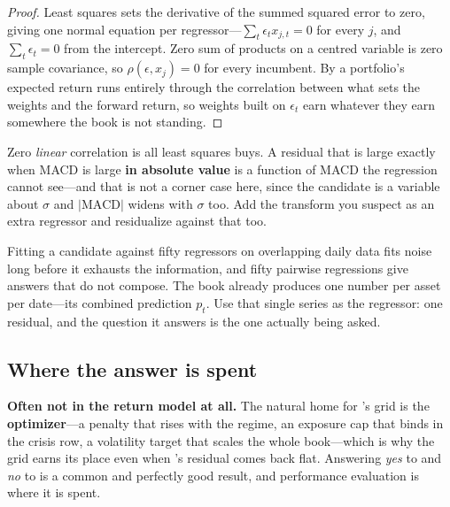 \begin{proof}
Least squares sets the derivative of the summed squared error to zero, giving one normal equation per
regressor---$\sum_t \epsilon_t x_{j,t} = 0$ for every $j$, and $\sum_t \epsilon_t = 0$ from the
intercept. Zero sum of products on a centred variable is zero sample covariance, so
$\rho(\epsilon, x_j) = 0$ for every incumbent. By  a
portfolio's expected return runs entirely through the correlation between what sets the weights and
the forward return, so weights built on $\epsilon_t$ earn whatever they earn somewhere the book is
not standing.
\end{proof}

\begin{note}
Zero \emph{linear} correlation is all least squares buys. A residual that is large exactly when MACD
is large \textbf{in absolute value} is a function of MACD the regression cannot see---and that is
not a corner case here, since the candidate is a variable about $\sigma$ and
$\left| \mathrm{MACD} \right|$ widens with $\sigma$ too. Add the transform you suspect as an extra
regressor and residualize against that too.
\end{note}

\begin{note}
Fitting a candidate against fifty regressors on overlapping daily data fits noise long before it
exhausts the information, and fifty pairwise regressions give answers that do not compose. The book
already produces one number per asset per date---its combined prediction $p_t$. Use that single
series as the regressor: one residual, and the question it answers is the one actually being asked.
\end{note}

\subsection{Where the answer is spent}\label{sec:answer-spent}

\textbf{Often not in the return model at all.} The natural home for 's grid
is the \textbf{optimizer}---a penalty that rises with the regime, an exposure cap that binds in the
crisis row, a volatility target that scales the whole book---which is why the grid earns its place
even when 's residual comes back flat. Answering \emph{yes} to
 and \emph{no} to  is a common and perfectly good
result, and performance evaluation is where it is spent.

